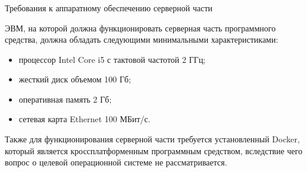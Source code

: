 \subsubsection{} Требования к аппаратному обеспечению серверной части
\label{sec:analysis:research:req:server_requirments}

ЭВМ, на которой должна функционировать серверная часть программного средства, должна обладать следующими минимальными характеристиками:

\begin{itemize}
	\item процессор Intel Core i5 с тактовой частотой 2 ГГц;
	\item жесткий диск объемом 100 Гб;
	\item оперативная память 2 Гб;
	\item сетевая карта Ethernet 100 МБит/с.
\end{itemize}

Также для функционирования серверной части требуется установленный Docker, который является кроссплатформенным программным средством, вследствие чего вопрос о целевой операционной системе не рассматривается.